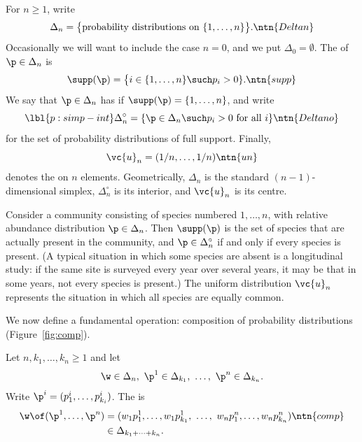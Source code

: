 For $n \geq 1$, write 
\[
\Delta_n 
=
\bigl\{ \text{probability distributions on } \{1, \ldots, n\} \bigr\}.
\ntn{Deltan}
\]
Occasionally we will want to
include the case $n = 0$, and we put $\Delta_0 = \emptyset$.  The
 of $\p \in \Delta_n$ is
\[
\supp(\p) 
=
\bigl\{ 
i \in \{1, \ldots, n\} 
\such
p_i > 0 \}.
\ntn{supp}
\]
We say that $\p \in \Delta_n$ has  if $\supp(\p) = \{1, \ldots, n\}$, and write
\[
\lbl{p:simp-int}
\Delta_n^\circ 
=
\{ \p \in \Delta_n
\such
p_i > 0 \text{ for all } i \}
\ntn{Deltano}
\]
for the set of probability distributions of full support.  Finally,
\[
\vc{u}_n = (1/n, \ldots, 1/n)
\ntn{un}
\]
denotes the  on $n$ elements.  Geometrically, $\Delta_n$ is the standard
$(n - 1)$-dimensional simplex, $\Delta_n^\circ$ is its
interior, and $\vc{u}_n$ is its centre.

\begin{example}
Consider a community consisting of species numbered $1, \ldots, n$, with
relative abundance distribution $\p \in \Delta_n$.  Then $\supp(\p)$ is the
set of species that are actually present in the community, and $\p \in
\Delta_n^\circ$ if and only if every species is present.  (A typical
situation in which some species are absent is a longitudinal study: if the
same site is surveyed every year over several years, it may be that in some
years, not every species is present.)  The uniform distribution $\vc{u}_n$
represents the situation in which all species are equally common.
\end{example}

We now define a fundamental operation: composition of probability
distributions (Figure~\ref{fig:comp}).  

\begin{defn}
Let $n, k_1, \ldots, k_n \geq 1$ and let 
\[
\w \in \Delta_n, 
\
\p^1 \in \Delta_{k_1}, \ 
\ldots, \ 
\p^n \in \Delta_{k_n}.
\]
Write $\p^i = (p^i_1, \ldots, p^i_{k_i})$.  The
 is
% 
\begin{align*}
\w \of (\p^1, \ldots, \p^n)     &
=
(w_1 p^1_1, \ldots, w_1 p^1_{k_1}, 
\ \ldots, \ 
w_n p^n_1, \ldots, w_n p^n_{k_n})       
\ntn{comp}      \\
&
\in
\Delta_{k_1 + \cdots + k_n}.
\end{align*}
\end{defn}

